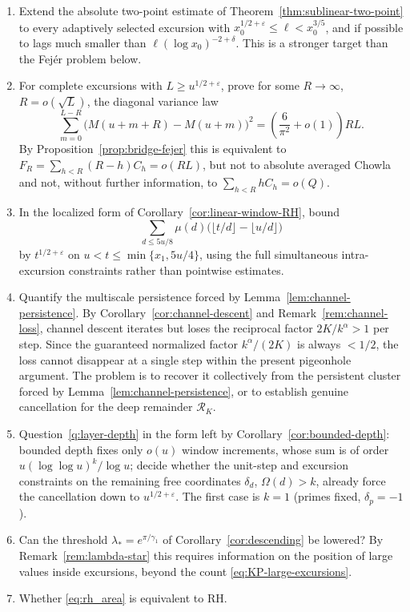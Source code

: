 \documentclass[11pt]{amsart}
\numberwithin{equation}{section}
\theoremstyle{plain}
\theoremstyle{definition}
\theoremstyle{remark}
\newcommand{\eps}{\varepsilon}
\begin{document}
\begin{enumerate}[label=\textup{(\arabic*)}]
\item Extend the absolute two-point estimate of
Theorem~\ref{thm:sublinear-two-point} to every adaptively selected excursion
with $x_0^{1/2+\eps}\le\ell<x_0^{3/5}$, and if possible to lags much smaller
than $\ell(\log x_0)^{-2+\delta}$. This is a stronger target than the Fej\'er
problem below.
\item For complete excursions with $L\ge u^{1/2+\eps}$, prove for some
$R\to\infty$, $R=o(\sqrt L)$, the diagonal variance law
\[
\sum_{m=0}^{L-R}\bigl(M(u+m+R)-M(u+m)\bigr)^2
=\left(\frac6{\pi^2}+o(1)\right)RL.
\]
By Proposition~\ref{prop:bridge-fejer} this is equivalent to
$F_R=\sum_{h<R}(R-h)C_h=o(RL)$, but not to absolute averaged Chowla and not,
without further information, to $\sum_{h<R}hC_h=o(Q)$.
\item In the localized form of Corollary~\ref{cor:linear-window-RH}, bound
\[
\sum_{d\le5u/8}\mu(d)
\bigl(\lfloor t/d\rfloor-\lfloor u/d\rfloor\bigr)
\]
by $t^{1/2+\eps}$ on
$u<t\le\min\{x_1,5u/4\}$, using the full simultaneous intra-excursion
constraints rather than pointwise estimates.
\item Quantify the multiscale persistence forced by
Lemma~\ref{lem:channel-persistence}.  By Corollary~\ref{cor:channel-descent}
and Remark~\ref{rem:channel-loss}, channel descent iterates but loses the reciprocal factor
$2K/k^\alpha>1$ per step.  Since the guaranteed normalized factor
$k^\alpha/(2K)$ is always $<1/2$, the loss cannot disappear at a single
step within the present pigeonhole argument.  The problem is to recover it
collectively from the persistent cluster forced by
Lemma~\ref{lem:channel-persistence}, or to establish genuine cancellation
for the deep remainder $\mathcal R_K$.
\item Question~\ref{q:layer-depth} in the form left by
Corollary~\ref{cor:bounded-depth}: bounded depth fixes only $o(u)$ window
increments, whose sum is of order $u(\log\log u)^k/\log u$; decide whether
the unit-step and excursion constraints on the remaining free coordinates
$\delta_d$, $\Omega(d)>k$, already force the cancellation down to
$u^{1/2+\eps}$. The first case is $k=1$ (primes fixed, $\delta_p=-1$).
\item Can the threshold $\lambda_*=e^{\pi/\gamma_1}$ of
Corollary~\ref{cor:descending} be lowered? By
Remark~\ref{rem:lambda-star} this requires information on the position of
large values inside excursions, beyond the count
\eqref{eq:KP-large-excursions}.
\item Whether \eqref{eq:rh_area} is equivalent to RH.

\end{enumerate}
\end{document}
